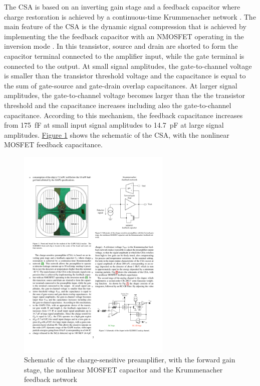 \par
The CSA is based on an inverting gain stage and a feedback capacitor where charge restoration is achieved by a continuous-time Krummenacher network \cite{krummenacher_1991_pixel}. The main feature of the CSA is the dynamic signal compression that is achieved by implementing the the feedback capacitor with an NMOSFET operating in the inversion mode \cite{manghisoni_2018_dynamic}. In this transistor, source and drain are shorted to form the capacitor terminal connected to the amplifier input, while the gate terminal is connected to the output. At small signal amplitudes, the gate-to-channel voltage is smaller than the transistor threshold voltage and the capacitance is equal to the sum of gate-source and gate-drain overlap capacitances. At larger signal amplitudes, the gate-to-channel voltage becomes larger than the the transistor threshold and the capacitance increases including also the gate-to-channel capacitance. According to this mechanism, the feedback capacitance increases from \SI{175}{\femto\farad} at small input signal amplitudes to \SI{14.7}{\pico\farad} at large signal amplitudes. \hyperref[figCSAschematic]{Figure \ref{figCSAschematic}} shows the schematic of the CSA, with the nonlinear MOSFET feedback capacitance.

\begin{figure}[h!]
    \centering
    \includegraphics[width=0.65\textwidth]{Images/chap1/CSA_schematic.pdf}
    \caption{Schematic of the charge-sensitive preamplifier, with the forward gain stage, the nonlinear MOSFET capacitor and the Krummenacher feedback network}
    \label{figCSAschematic}
\end{figure}

